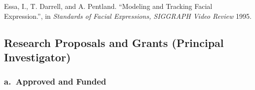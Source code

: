 \begin{pub}

\item Essa, I., T. Darrell, and A. Pentland. ``Modeling and Tracking
Facial Expression.'', in \textit{Standards of Facial Expressions,
SIGGRAPH Video Review} 1995.

\end{pub}

\subsection{Research Proposals and Grants (Principal Investigator)}
\label{subsec:research}


\def\funding#1#2#3#4#5{\item{{{\bf #1}}
\newline Sponsor: {#2}
\newline Investigator(s): {#3}
\newline Amount: {\sl #4}
\newline {\sl #5}}}


\subsubsection*{a.\quad~Approved and Funded}
\label{subsubsec:approved}


